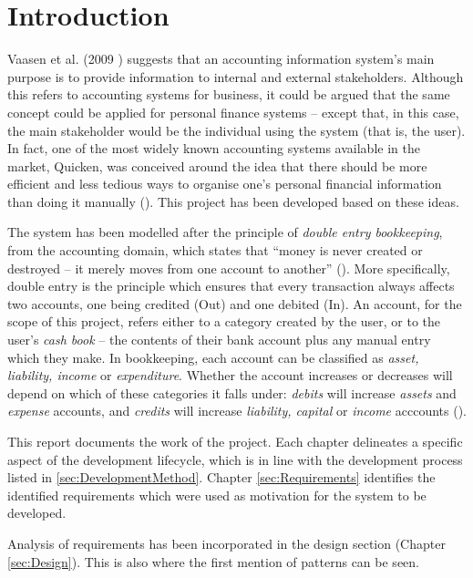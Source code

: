 \section{Introduction} \label{sec:Introduction}

Vaasen et al. (2009 \cite[cited][p.~8]{Boczko:2012:IAI:2331376}) suggests that
an accounting information system's main purpose is to provide information to
internal and external stakeholders. Although this refers to accounting systems
for business, it could be argued that the same concept could be applied for
personal finance systems -- except that, in this case, the main stakeholder
would be the individual using the system (that is, the user). In fact, one of
the most widely known accounting systems available in the market,
Quicken\texttrademark, was conceived around the idea that there should be more
efficient and less tedious ways to organise one's personal financial
information than doing it manually (\cite{quicken2017about}). This project has
been developed based on these ideas.

The system has been modelled after the principle of \emph{double entry
bookkeeping}, from the accounting domain, which states that ``money is never
created or destroyed -- it merely moves from one account to another''
(\cite[][Section 6.2]{fowler1997analysis}). More specifically, double entry is
the principle which ensures that every transaction always affects two accounts,
one being credited (Out) and one debited (In). An account, for the scope of
this project, refers either to a category created by the user, or to the user's
\emph{cash book} -- the contents of their bank account plus any manual entry
which they make. In bookkeeping, each account can be classified as \emph{asset,
liability, income} or \emph{expenditure}. Whether the account increases or
decreases will depend on which of these categories it falls under:
\emph{debits} will increase \emph{assets} and \emph{expense} accounts, and
\emph{credits} will increase \emph{liability, capital} or \emph{income}
acccounts (\cite[][pp.~18-19]{wood2004book}).

This report documents the work of the project. Each chapter delineates a
specific aspect of the development lifecycle, which is in line with the
development process listed in \ref{sec:DevelopmentMethod}. Chapter
\ref{sec:Requirements} identifies the identified requirements which were used
as motivation for the system to be developed.

Analysis of requirements has been incorporated in the design section (Chapter
\ref{sec:Design}). This is also where the first mention of patterns can be
seen.
